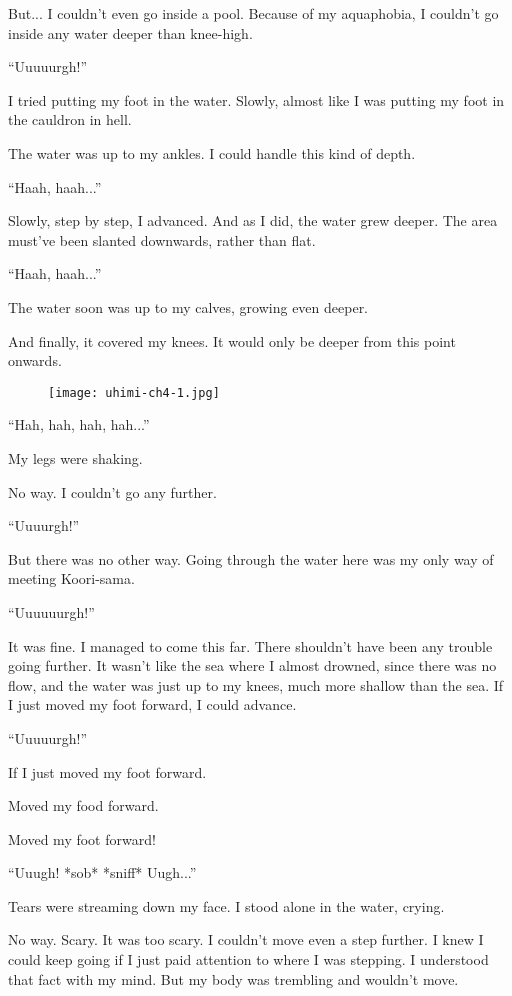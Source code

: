 But... I couldn't even go inside a pool. Because of my aquaphobia, I couldn't go inside any water deeper than knee-high.

``Uuuuurgh!''

I tried putting my foot in the water. Slowly, almost like I was putting my foot in the cauldron in hell.

The water was up to my ankles. I could handle this kind of depth.

``Haah, haah...''

Slowly, step by step, I advanced. And as I did, the water grew deeper. The area must've been slanted downwards, rather than flat.

``Haah, haah...''

The water soon was up to my calves, growing even deeper.

And finally, it covered my knees. It would only be deeper from this point onwards.

\begin{figure}[p]
\texttt{[image: uhimi-ch4-1.jpg]}
\end{figure}

``Hah, hah, hah, hah...''

My legs were shaking.

No way. I couldn't go any further.

``Uuuurgh!''

But there was no other way. Going through the water here was my only way of meeting Koori-sama.

``Uuuuuurgh!''

It was fine. I managed to come this far. There shouldn't have been any trouble going further. It wasn't like the sea where I almost drowned, since there was no flow, and the water was just up to my knees, much more shallow than the sea. If I just moved my foot forward, I could advance.

``Uuuuurgh!''

If I just moved my foot forward.

Moved my food forward.

Moved my foot forward!

``Uuugh! *sob* *sniff* Uugh...''

Tears were streaming down my face. I stood alone in the water, crying.

No way. Scary. It was too scary. I couldn't move even a step further. I knew I could keep going if I just paid attention to where I was stepping. I understood that fact with my mind. But my body was trembling and wouldn't move.

